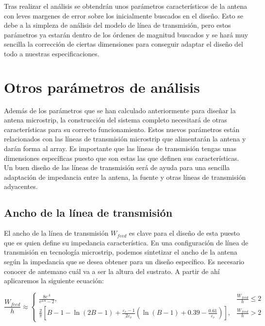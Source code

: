 \par Tras realizar el análisis se obtendrán unos parámetros característicos de la antena con leves margenes de error sobre los inicialmente buscados en el diseño. Esto se debe a la simpleza de análisis del modelo de línea de transmisión, pero estos parámetros ya estarán dentro de los órdenes de magnitud buscados y se hará muy sencilla la corrección de ciertas dimensiones para conseguir adaptar el diseño del todo a nuestras especificaciones.

\section{Otros parámetros de análisis}
\par Además de los parámetros que se han calculado anteriormente para diseñar la antena microstrip, la construcción del sistema completo necesitará de otras características para su correcto funcionamiento. Estos nuevos parámetros están relacionados con las líneas de transmisión microstrip que alimentarán la antena y darán forma al array. Es importante que las líneas de transmisión tengas unas dimensiones específicas puesto que son estas las que definen sus características. Un buen diseño de las líneas de transmisión será de ayuda para una sencilla adaptación de impedancia entre la antena, la fuente y otras líneas de transmisión adyacentes.

\subsection{Ancho de la línea de transmisión}
\par El ancho de la línea de transmisión $W_{feed}$ es clave para el diseño de esta puesto que es quien define su impedancia característica. En una configuración de línea de transmisión en tecnología microstrip, podemos sintetizar el ancho de la antena según la impedancia que se desea obtener para un diseño específico. Es necesario conocer de antemano cuál va a ser la altura del sustrato. A partir de ahí aplicaremos la siguiente ecuación:

\begin{equation}
	\frac{W_{feed}}{h}\approx \begin{cases}
\frac{8e^{A}}{e^{2A}-2}, & \frac{W_{feed}}{h}\leq 2
\\ \frac{2}{\pi}\left [ B-1-\ln(2B-1)+\frac{\varepsilon _{r}-1}{2\varepsilon _{r}}\left ( \ln(B-1)+0.39-\frac{0.61}{\varepsilon _{r}} \right ) \right ], & \frac{W_{feed}}{h}>  2
\end{cases}
	\label{eq:wh}
\end{equation}

